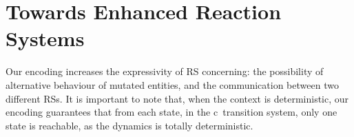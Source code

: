 
\section{Towards Enhanced  Reaction Systems}
\label{sec:discussion}

Our encoding increases the expressivity of  RS  concerning:
the possibility of alternative behaviour of
mutated entities, and  the communication between two different 
RSs.
It is important to note that, when the context is deterministic, our encoding guarantees that from each state, 
in the  c\CNA \ transition system, only one state is reachable, 
as the dynamics is totally deterministic.


